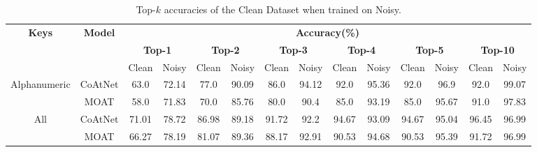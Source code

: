 \documentclass[a4paper,11pt,twoside]{report}
\theoremstyle{definition}
\begin{document}
\begin{table}[h!]
\centering
\caption{Top-$k$ accuracies of the Clean Dataset when trained on Noisy.}
\begin{adjustbox}{max width=\textwidth}
\begin{tabular}{c|c|c c | c c | c c | c c | c c | c c}
\hline
\textbf{Keys} & \textbf{Model} & \multicolumn{12}{c}{\textbf{Accuracy(\%)}} \\
\cline{3-14}
& & \multicolumn{2}{c|}{\textbf{Top-1}} & \multicolumn{2}{c|}{\textbf{Top-2}} & \multicolumn{2}{c|}{\textbf{Top-3}} & \multicolumn{2}{c|}{\textbf{Top-4}} & \multicolumn{2}{c|}{\textbf{Top-5}} & \multicolumn{2}{c}{\textbf{Top-10}} \\
\cline{3-14}
& & Clean & Noisy & Clean & Noisy & Clean & Noisy & Clean & Noisy & Clean & Noisy & Clean & Noisy \\
\hline
\multirow{2}{*}{Alphanumeric} & CoAtNet & 63.0 & 72.14 & 77.0 & 90.09 & 86.0 & 94.12 &  92.0 & 95.36 & 92.0 & 96.9 & 92.0 & 99.07\\
                              & MOAT & 58.0 & 71.83 & 70.0 & 85.76 & 80.0 & 90.4 &  85.0 & 93.19 & 85.0  & 95.67& 91.0 & 97.83\\
\hline
\multirow{2}{*}{All} & CoAtNet  & 71.01 & 78.72 & 86.98 & 89.18 & 91.72 & 92.2 & 94.67 & 93.09 & 94.67 & 95.04 & 96.45 & 96.99 \\
                    & MOAT    & 66.27 & 78.19 & 81.07 & 89.36 & 88.17 & 92.91 & 90.53 & 94.68 & 90.53 & 95.39 & 91.72 & 96.99 \\

\hline
\end{tabular}
\end{adjustbox}
\label{tab:topk_noisy_train}
\end{table}
\end{document}
